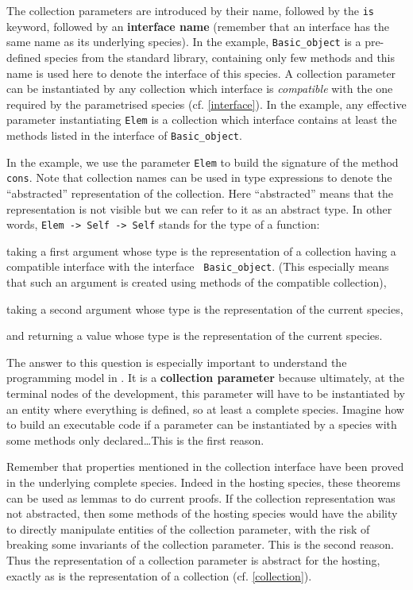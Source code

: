 The collection parameters are introduced by their name, followed by the {\tt is}
keyword, followed by an {\bf interface name} (remember that an interface has
the same name as its underlying species). In the example, {\tt Basic\_object}
is a pre-defined species from the standard library, containing only few
methods and this name is used here to denote the interface of this species.
A collection parameter can be instantiated by any collection which interface
is {\em compatible} with the one required by
the parametrised species (cf. \ref{interface}). In the example, any effective
parameter instantiating {\tt Elem} is a collection which interface contains
at least the methods listed in the interface of {\tt Basic\_object}.

\smallskip
In the example, we use the parameter {\tt Elem} to build the signature
of the method {\tt cons}. Note that collection names can be used
in type expressions to denote the ``abstracted'' representation of the
collection. Here ``abstracted'' means that the
representation is not visible but we can refer to it
as an abstract type. In other words, {\tt Elem -> Self -> Self}
stands for the type of a function:
\begin{compact-itemize}
\item taking a first argument whose type is the representation  of a
  collection having a compatible interface with the interface {\tt
    Basic\_object}. (This especially means that such an argument is
  created using methods of the compatible collection),
  \item taking a second argument whose type is the representation of
    the current species,
  \item and returning a value whose type is the representation  of the
    current species.
\end{compact-itemize}


The answer to this question is especially important to
understand the programming model in {\focal}. It is a {\bf collection
parameter} because ultimately, at the terminal nodes of the
development, this parameter will have to be instantiated by an entity
where everything is defined, so at least a complete species. Imagine
how to build an executable code if a parameter can be instantiated by
a species with some methods only declared\ldots This is the first
reason.

Remember that properties mentioned in the collection interface have
been proved in the underlying complete species. Indeed in the hosting
species, these theorems can be used as lemmas to do current proofs. If
the collection representation was not abstracted, then some methods of
the hosting species would have the ability to directly manipulate
entities of the collection parameter, with the risk of breaking some
invariants of the collection parameter.  This is the second reason.
Thus the representation of a collection parameter is abstract for the
hosting, exactly as is the representation of a collection (cf.
\ref{collection}).

